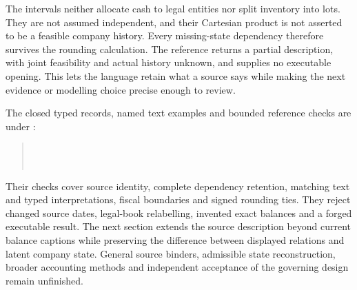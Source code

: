 The intervals neither allocate cash to legal entities nor split inventory
into lots. They are not assumed independent, and their Cartesian product
is not asserted to be a feasible company history. Every missing-state
dependency therefore survives the rounding calculation. The reference
returns a partial description, with joint feasibility and actual history
unknown, and supplies no executable opening. This lets the language retain
what a source says while making the next evidence or modelling choice
precise enough to review.

The closed typed records, named text examples and bounded reference checks
are under :
\begin{quote}\small
{}\\
\\
\end{quote}
Their checks cover source identity, complete dependency retention, matching
text and typed interpretations, fiscal boundaries and signed rounding ties.
They reject changed source dates, legal-book relabelling, invented exact
balances and a forged executable result. The next section extends the source
description beyond current balance captions while preserving the difference
between displayed relations and latent company state. General source binders, admissible
state reconstruction, broader accounting methods and independent acceptance
of the governing design remain unfinished.








